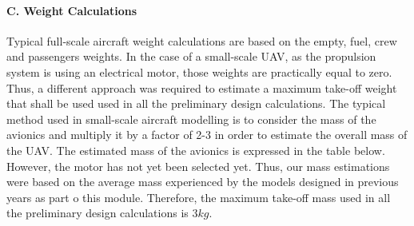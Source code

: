\documentclass[12pt]{article}
\begin{document}
\paragraph{C. Weight Calculations}
Typical full-scale aircraft weight calculations are based on the empty, fuel, crew and passengers weights. In the case of a small-scale UAV, as the propulsion system is using an electrical motor, those weights are practically equal to zero. Thus, a different approach was required to estimate a maximum take-off weight that shall be used used in all the preliminary design calculations. The typical method used in small-scale aircraft modelling is to consider the mass of the avionics and multiply it by a factor of 2-3 in order to estimate the overall mass of the UAV. The estimated mass of the avionics is expressed in the table below. 
However, the motor has not yet been selected yet. Thus, our mass estimations were based on the average mass experienced by the models designed in previous years as part o this module. Therefore, the maximum take-off mass used in all the preliminary design calculations is $3kg$. \\
\end{document}
